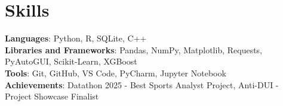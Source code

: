 \documentclass[letterpaper,11pt]{article}
\begin{document}
%
\section{Skills}
 \begin{itemize}[leftmargin=0.15in, label={}]
    \small{\item{
     \textbf{Languages}{: Python, R, SQLite, C++} \\
     \textbf{Libraries and Frameworks}{: Pandas, NumPy, Matplotlib, Requests, PyAutoGUI, Scikit-Learn, XGBoost} \\
     \textbf{Tools}{: Git, GitHub, VS Code, PyCharm, Jupyter Notebook} \\
     \textbf{Achievements}{: Datathon 2025 - Best Sports Analyst Project, Anti-DUI - Project Showcase Finalist }
    }}
 \end{itemize}
\end{document}
